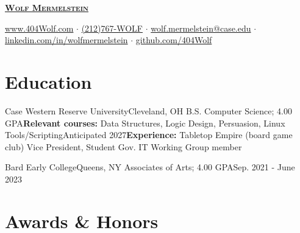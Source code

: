 \documentclass[letterpaper, 10pt]{article}
\begin{document}


\begin{center}
	\textbf{\Huge \scshape \href{https://404wolf.com}{Wolf Mermelstein}} \\ \vspace{4pt}

	\href{https://404wolf.com}{www.404Wolf.com}
	$\cdot$
	\small \href{tel:(+12127679653)}{(212)767-WOLF}
	$\cdot$
	\href{mailto:wolf.mermelstein@case.edu}{wolf.mermelstein@case.edu}
	$\cdot$
	\href{https://linkedin.com/in/wolfmermelstein}{linkedin.com/in/wolfmermelstein}
	$\cdot$
	\href{https://github.com/404wolf}{github.com/404Wolf}
\end{center}
\vspace{-16px}

\section{Education}
\resumeSubHeadingListStart
\resumeSubheading
{Case Western Reserve University}{Cleveland, OH}
{B.S. Computer Science; 4.00 GPA}{\textbf{Relevant courses:} Data Structures, Logic Design, Persuasion, Linux Tools/Scripting}{Anticipated 2027}{\textbf{Experience:} Tabletop Empire (board game club) Vice President, Student Gov. IT Working Group member}

\vspace{3pt}

\resumeSubheading
{Bard Early College}{Queens, NY}{}
{Associates of Arts;  4.00 GPA}{Sep. 2021 - June 2023}{}
\resumeSubHeadingListEnd

\vspace{-7pt}

\section{Awards \& Honors}
\resumeSubHeadingListStart

\end{document}
